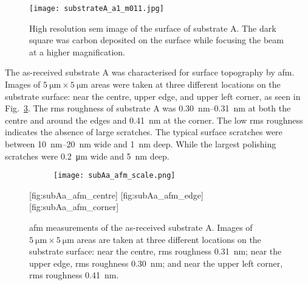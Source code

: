 \begin{figure}[htbp]
    \centering
    \texttt{[image: substrateA\_a1\_m011.jpg]}
    \caption[\Ac{sem} image of surface scratches on substrate A.]{High resolution \ac{sem} image of the surface of substrate A. The dark square was carbon deposited on the surface while focusing the beam at a higher magnification.}\label{fig:subAa_scratches}
    \label{fig:SEM_A_surface}
\end{figure}

The as-received substrate A was characterised for surface topography by \ac{afm}. Images of $\SI{5}{\micro\metre}\times\SI{5}{\micro\metre}$ areas were taken at three different locations on the substrate surface: near the centre, upper edge, and upper left corner, as seen in Fig.~\ref{fig:subAa_afm}. The \ac{rms} roughness of substrate A was \SIrange{0.30}{0.31}{\nano\metre} at both the centre and around the edges and \SI{0.41}{\nano\metre} at the corner. The low \ac{rms} roughness indicates the absence of large scratches. The typical surface scratches were between \SIrange{10}{20}{\nano\metre} wide and \SI{1}{\nano\metre} deep. While the largest polishing scratches were \SI{0.2}{\micro\metre} wide and \SI{5}{\nano\metre} deep.

\begin{figure}[htbp]
    \centering
    \begin{subfigure}[c]{0.032\linewidth}
        \label{fig:subAa_afm_scale}\captionsetup{list=no}
        \texttt{[image: subAa\_afm\_scale.png]}
    \end{subfigure}
    \hfill
    [fig:subAa_afm_centre]
    \hfill
    [fig:subAa_afm_edge]%
    \hfill
    [fig:subAa_afm_corner]%
    \caption[\Ac{afm} of as-received substrate A.]{\Ac{afm} measurements of the as-received substrate A. Images of $\SI{5}{\micro\metre}\times\SI{5}{\micro\metre}$ areas are taken at three different locations on the substrate surface:  near the centre, \ac{rms} roughness \SI{0.31}{\nano\metre};  near the upper edge, \ac{rms} roughness \SI{0.30}{\nano\metre}; and  near the upper left corner, \ac{rms} roughness \SI{0.41}{\nano\metre}.}\label{fig:subAa_afm}
\end{figure} %


